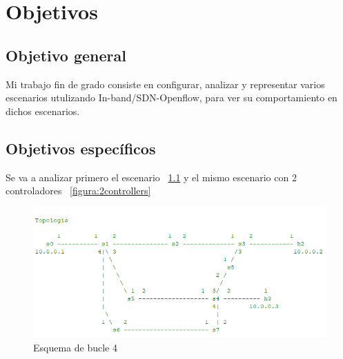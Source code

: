 \documentclass[a4paper, 12pt]{book}
\begin{document}
	
	
	
	
	
	\cleardoublepage %
	\chapter{Objetivos} %
	\label{chap:objetivos} %
	
	\section{Objetivo general} %
	\label{sec:objetivo-general} %
	
	Mi trabajo fin de grado consiste en configurar, analizar y representar varios escenarios utulizando In-band/SDN-Openflow, para ver su comportamiento en dichos escenarios.
	
	\section{Objetivos específicos}
	\label{sec:objetivos-especificos}
	
 	Se va a analizar primero el escenario ~\ref{figura:bucle4} y el mismo escenario con 2 controladores ~\ref{figura:2controllers}
	
	\begin{figure}
		\centering
		\includegraphics[width=16cm, keepaspectratio]{img/bucle4}
		\caption{Esquema de bucle 4}
		\label{figura:bucle4}
	\end{figure}
	
\end{document}
